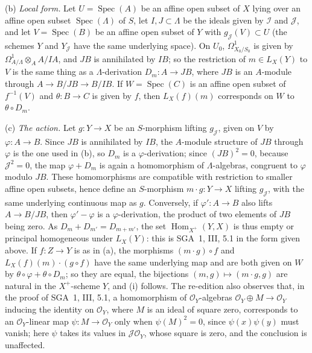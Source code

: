 (b) \emph{Local form.} Let \(U=\operatorname{Spec}(A)\) be an affine open
subset of \(X\) lying over an affine open subset
\(\operatorname{Spec}(\Lambda)\) of \(S\), let \(I,J\subset\Lambda\) be the
ideals given by \(\mathscr I\) and \(\mathscr J\), and let
\(V=\operatorname{Spec}(B)\) be an affine open subset of \(Y\) with
\(g_{\mathscr J}(V)\subset U\) (the schemes \(Y\) and \(Y_{\mathscr J}\) have
the same underlying space). On \(U_0\), \(\Omega^1_{X_0/S_0}\) is given by
\(\Omega^1_{A/\Lambda}\otimes_AA/IA\), and \(JB\) is annihilated by \(IB\);
so the restriction of \(m\in L_X(Y)\) to \(V\) is the same thing as a
\(\Lambda\)-derivation \(D_m\colon A\to JB\), where \(JB\) is an \(A\)-module
through \(A\to B/JB\to B/IB\). If \(W=\operatorname{Spec}(C)\) is an affine
open subset of \(f^{-1}(V)\) and \(\theta\colon B\to C\) is given by \(f\),
then \(L_X(f)(m)\) corresponds on \(W\) to \(\theta\circ D_m\).

(c) \emph{The action.} Let \(g\colon Y\to X\) be an \(S\)-morphism lifting
\(g_{\mathscr J}\), given on \(V\) by \(\varphi\colon A\to B\). Since \(JB\)
is annihilated by \(IB\), the \(A\)-module structure of \(JB\) through
\(\varphi\) is the one used in (b), so \(D_m\) is a \(\varphi\)-derivation;
since \((JB)^2=0\), because \(\mathscr J^2=0\), the map \(\varphi+D_m\) is
again a homomorphism of \(\Lambda\)-algebras, congruent to \(\varphi\) modulo
\(JB\). These homomorphisms are compatible with restriction to smaller
affine open subsets, hence define an \(S\)-morphism \(m\cdot g\colon Y\to X\)
lifting \(g_{\mathscr J}\), with the same underlying continuous map as
\(g\). Conversely, if \(\varphi'\colon A\to B\) also lifts
\(A\to B/JB\), then \(\varphi'-\varphi\) is a \(\varphi\)-derivation, the
product of two elements of \(JB\) being zero. As \(D_m+D_{m'}=D_{m+m'}\),
the set \(\operatorname{Hom}_{X^+}(Y,X)\) is thus empty or principal
homogeneous under \(L_X(Y)\): this is SGA~1, III, 5.1 in the form given
above. If \(f\colon Z\to Y\) is as in (a), the morphisms
\((m\cdot g)\circ f\) and \(L_X(f)(m)\cdot(g\circ f)\) have the same
underlying map and are both given on \(W\) by
\(\theta\circ\varphi+\theta\circ D_m\); so they are equal, the bijections
\((m,g)\mapsto(m\cdot g,g)\) are natural in the \(X^+\)-scheme \(Y\), and
(i) follows. The re-edition also observes that, in the proof of SGA~1, III,
5.1, a homomorphism of \(\mathscr O_Y\)-algebras
\(\mathscr O_Y\oplus M\to\mathscr O_Y\) inducing the identity on
\(\mathscr O_Y\), where \(M\) is an ideal of square zero, corresponds to an
\(\mathscr O_Y\)-linear map \(\psi\colon M\to\mathscr O_Y\) only when
\(\psi(M)^2=0\), since \(\psi(x)\psi(y)\) must vanish; here \(\psi\) takes
its values in \(\mathscr J\mathscr O_Y\), whose square is zero, and the
conclusion is unaffected.

